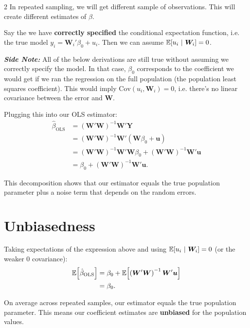 \documentclass[12pt]{article}
\begin{document}
\begin{multicols}{2}
  In repeated sampling, we will get different sample of observations.
  This will create different estimates of $\hat{\beta}$.

  Say the we have \textbf{correctly specified} the conditional expectation function, i.e. the true model $y_i = \bm{W}_i' \beta_0 + u_i$.
  Then we can assume $\expec{u_i}{\bm{W}_i} = 0$.

  \bigskip
  \emph{\textbf{Side Note:}} All of the below derivations are still true without assuming we correctly specify the model.
  In that case, $\beta_0$ corresponds to the coefficient we would get if we ran the regression on the full population (the population least squares coefficient).
  This would imply $\text{Cov}(u_i, \bm{W}_i) = 0$, i.e. there's no linear covariance between the error and $\bm{W}$.

  Plugging this into our OLS estimator:
  \begin{align*}
    \hat{\beta}_{\text{OLS}}
    & = \left(\bm{W}' \bm{W} \right)^{-1} \bm{W}' \bm{Y}                                                            \\
    & = \left(\bm{W}' \bm{W} \right)^{-1} \bm{W}' \left( \bm{W} \beta_0 + \bm{u} \right)                            \\
    & = \left(\bm{W}' \bm{W} \right)^{-1} \bm{W}' \bm{W} \beta_0 + \left(\bm{W}' \bm{W} \right)^{-1} \bm{W}' \bm{u} \\
    & = \beta_0 + \left(\bm{W}' \bm{W} \right)^{-1} \bm{W}' \bm{u}.
  \end{align*}

  This decomposition shows that our estimator equals the true population parameter plus a noise term that depends on the random errors.

  \section*{Unbiasedness}

  Taking expectations of the expression above and using $\expec{u_i}{\bm{W}_i} = 0$ (or the weaker 0 covariance):
  \begin{align*}
    \expec{\hat{\beta}_{\text{OLS}}}
    & = \beta_0 + \expec{ \left(\bm{W}' \bm{W} \right)^{-1} \bm{W}' \bm{u} } \\
    & = \beta_0.
  \end{align*}

  On average across repeated samples, our estimator equals the true population parameter.
  This means our coefficient estimates are \textbf{unbiased} for the population values.


\end{multicols}
\end{document}
